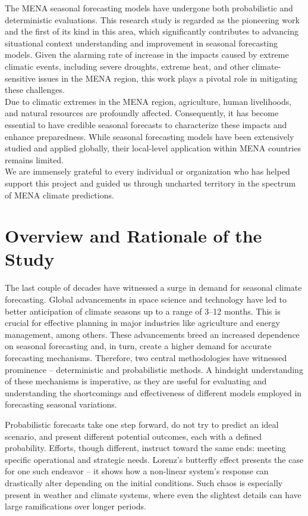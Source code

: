 The MENA seasonal forecasting models have undergone both probabilistic and deterministic evaluations. This research study is regarded as the pioneering work and the first of its kind in this area, which significantly contributes to advancing situational context understanding and improvement in seasonal forecasting models. Given the alarming rate of increase in the impacts caused by extreme climatic events, including severe droughts, extreme heat, and other climate-sensitive issues in the MENA region, this work plays a pivotal role in mitigating these challenges.\\

Due to climatic extremes in the MENA region, agriculture, human livelihoods, and natural resources are profoundly affected. Consequently, it has become essential to have credible seasonal forecasts to characterize these impacts and enhance preparedness. While seasonal forecasting models have been extensively studied and applied globally, their local-level application within MENA countries remains limited.\\

We are immensely grateful to every individual or organization who has helped support this project and guided us through uncharted territory in the spectrum of MENA climate predictions.\\
\chapter{Overview and Rationale of the Study}

The last couple of decades have witnessed a surge in demand for seasonal climate forecasting. Global advancements in space science and technology have led to better anticipation of climate seasons up to a range of 3--12 months. This is crucial for effective planning in major industries like agriculture and energy management, among others. These advancements breed an increased dependence on seasonal forecasting and, in turn, create a higher demand for accurate forecasting mechanisms. Therefore, two central methodologies have witnessed prominence -- deterministic and probabilistic methods. A hindsight understanding of these mechanisms is imperative, as they are useful for evaluating and understanding the shortcomings and effectiveness of different models employed in forecasting seasonal variations.\

Probabilistic forecasts take one step forward, do not try to predict an ideal scenario, and present different potential outcomes, each with a defined probability. Efforts, though different, instruct toward the same ends: meeting specific operational and strategic needs. Lorenz’s butterfly effect presents the case for one such endeavor -- it shows how a non-linear system’s response can drastically alter depending on the initial conditions. Such chaos is especially present in weather and climate systems, where even the slightest details can have large ramifications over longer periods.\\

